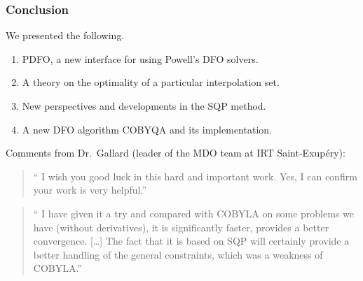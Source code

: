 \documentclass{polyu-presentation}
\begin{document}
\begin{frame}
    \frametitle{Conclusion}

	We presented the following.
    \begin{enumerate}
        \item \alert{PDFO}, a new interface for using Powell's DFO solvers.
        \item A theory on the \alert{optimality} of a particular interpolation set.
        \item New perspectives and developments in the \alert{SQP method}.
        \item A new DFO algorithm \alert{COBYQA} and its implementation.
    \end{enumerate}

    Comments from Dr.\ Gallard (leader of the MDO team at IRT Saint-Exup{\'{e}}ry):

    \begin{block}{}
        \begin{quote}
            \small\enquote{%
            I wish you good luck in this hard and \alert{important} work.
            Yes, I can confirm your work is very \alert{helpful}.}
        \end{quote}
    \end{block}

    \begin{block}{}
        \begin{quote}
            \small\enquote{%
                I have given it a try and compared with COBYLA on some problems we have (without derivatives), it is \alert{significantly faster}, provides a better convergence.
                [\dots] The fact that it is based on SQP will certainly provide a better handling of the general constraints, which was a weakness of COBYLA.}
        \end{quote}
    \end{block}
\end{frame}
\end{document}
